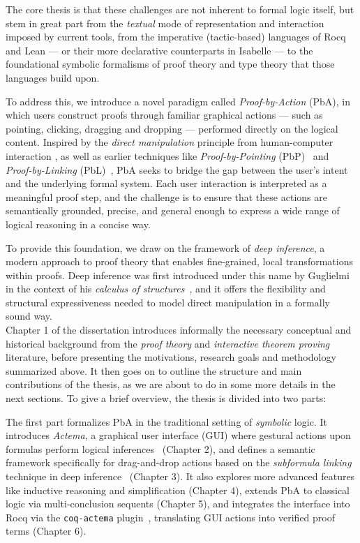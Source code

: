 \documentclass[11pt]{article}
\begin{document}
The core thesis is that these challenges are not inherent to formal logic itself, but stem in great part from the \emph{textual} mode of representation and interaction imposed by current tools, from the imperative (tactic-based) languages of Rocq and Lean --- or their more declarative counterparts in Isabelle --- to the foundational symbolic formalisms of proof theory and type theory that those languages build upon.

To address this, we introduce a novel paradigm called \emph{Proof-by-Action} (PbA), in which users construct proofs through familiar graphical actions --- such as pointing, clicking, dragging and dropping --- performed directly on the logical content. Inspired by the \emph{direct manipulation} principle from human-computer interaction \cite{shneiderman_direct_1983}, as well as earlier techniques like \emph{Proof-by-Pointing} (PbP)~\cite{PbP} and \emph{Proof-by-Linking} (PbL)~\cite{chaudhuri_certifying_2022}, PbA seeks to bridge the gap between the user’s intent and the underlying formal system. Each user interaction is interpreted as a meaningful proof step, and the challenge is to ensure that these actions are semantically grounded, precise, and general enough to express a wide range of logical reasoning in a concise way.

To provide this foundation, we draw on the framework of \emph{deep inference}, a modern approach to proof theory that enables fine-grained, local transformations within proofs. Deep inference was first introduced under this name by Guglielmi in the context of his \emph{calculus of structures}~\cite{Guglielmi1999ACO}, and it offers the flexibility and structural expressiveness needed to model direct manipulation in a formally sound way.
\\

Chapter 1 of the dissertation introduces informally the necessary conceptual and historical background from the \emph{proof theory} and \emph{interactive theorem proving} literature, before presenting the motivations, research goals and methodology summarized above. It then goes on to outline the structure and main contributions of the thesis, as we are about to do in some more details in the next sections. To give a brief overview, the thesis is divided into two parts:

The first part formalizes PbA in the traditional setting of \emph{symbolic} logic. It introduces \emph{Actema}, a graphical user interface (GUI) where gestural actions upon formulas perform logical inferences~\cite{Actema:link} (Chapter 2), and defines a semantic framework specifically for drag-and-drop actions based on the \emph{subformula linking} technique in deep inference~\cite{Chaudhuri2013} (Chapter 3). It also explores more advanced features like inductive reasoning and simplification (Chapter 4), extends PbA to classical logic via multi-conclusion sequents (Chapter 5), and integrates the interface into Rocq via the \texttt{coq-actema} plugin~\cite{coq-actema}, translating GUI actions into verified proof terms (Chapter 6).
\end{document}
